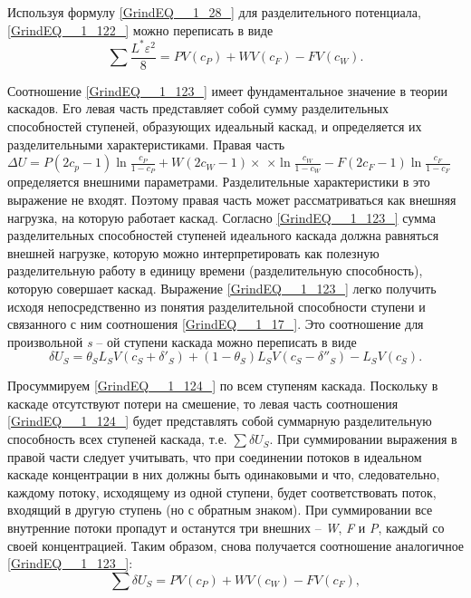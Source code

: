 Используя формулу \ref{GrindEQ__1_28_} для разделительного потенциала, \ref{GrindEQ__1_122_} можно переписать в виде
\begin{equation} \label{GrindEQ__1_123_} 
\sum \frac{L^{*} \varepsilon ^{2} }{8} =PV(c_{P} )+WV(c_{F} )-FV(c_{W} ) .                 
\end{equation} 

Соотношение \ref{GrindEQ__1_123_} имеет фундаментальное значение в теории каскадов. Его левая часть представляет собой сумму разделительных способностей ступеней, образующих идеальный каскад, и определяется их разделительными характеристиками. Правая часть $\Delta U=P(2c_{p} -1)\ln \frac{c_{P} }{1-c_{P} } +W(2c_{W} -1)\times $ $\times \ln \frac{c_{W} }{1-c_{W} } -F(2c_{F} -1)\ln \frac{c_{F} }{1-c_{F} } $ определяется внешними параметрами. Разделительные характеристики в это выражение не входят. Поэтому правая часть может рассматриваться как внешняя нагрузка, на которую работает каскад. Согласно \ref{GrindEQ__1_123_} сумма разделительных способностей ступеней идеального каскада должна равняться внешней нагрузке, которую можно интерпретировать как полезную разделительную работу в единицу времени (разделительную способность), которую совершает каскад. Выражение \ref{GrindEQ__1_123_} легко получить исходя непосредственно из понятия разделительной способности ступени и связанного с ним соотношения \ref{GrindEQ__1_17_}. Это соотношение для произвольной \textit{s} -- ой ступени каскада можно переписать в виде
\begin{equation} \label{GrindEQ__1_124_} 
\delta U_{S} =\theta _{S} L_{S} V(c_{S} +\delta '_{S} )+(1-\theta _{S} )L_{S} V(c_{S} -\delta ''_{S} )-L_{S} V(c_{S} ).         
\end{equation} 

Просуммируем \ref{GrindEQ__1_124_} по всем ступеням каскада. Поскольку в каскаде отсутствуют потери на смешение, то левая часть соотношения \ref{GrindEQ__1_124_} будет представлять собой суммарную разделительную способность всех ступеней каскада, т.е. $\sum \delta U_{S}  $. При суммировании выражения в правой части следует учитывать, что при соединении потоков в идеальном каскаде концентрации в них должны быть одинаковыми и что, следовательно, каждому потоку, исходящему из одной ступени, будет соответствовать поток, входящий в другую ступень (но с обратным знаком). При суммировании все внутренние потоки пропадут и останутся три внешних -- \textit{W}, \textit{F} и \textit{P}, каждый со своей концентрацией. Таким образом, снова получается соотношение аналогичное \ref{GrindEQ__1_123_}:
\begin{equation} \label{GrindEQ__1_125_} 
\sum \delta U_{S} =PV(c_{P} )+WV(c_{W} )-FV(c_{F} ) ,                             
\end{equation} 

